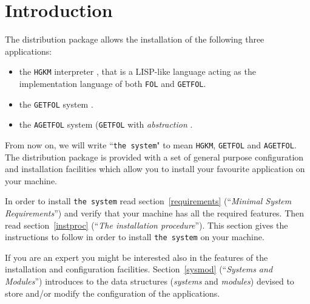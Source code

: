 \section{Introduction}

The distribution package allows the installation of the following three
applications:
%
\begin{itemize}
	\item
		the {\tt HGKM} interpreter \cite{giunchiglia35}, that is a LISP-like
		language acting as the implementation language of both {\tt FOL}
		and {\tt GETFOL}.
	\item
		the {\tt GETFOL} system \cite{giunchiglia12,giunchiglia29}.
	\item
		the {\tt AGETFOL} system ({\tt GETFOL} with {\em abstraction}
		\cite{giunchiglia7}.
\end{itemize}

From now on, we will write ``{\tt the system}" to mean {\tt HGKM},
{\tt GETFOL} and {\tt AGETFOL}.
The distribution package is provided with a set of general purpose
configuration and installation facilities which allow you to install your
favourite application on your machine.

In order to install {\tt the system} read section~\ref{requirements}
(``{\it Minimal System Requirements}'') and verify that your machine
has all the required features.
Then read section~\ref{instproc} (``{\it The installation procedure}'').
This section gives the instructions to follow in order to install
{\tt the system} on your machine.

If you are an expert you might be interested also in the features
of the installation and configuration facilities.
Section~\ref{sysmod} (``{\it Systems and Modules}'') introduces
to the data structures ({\it systems} and {\it modules}) devised
to store and/or modify the configuration of the applications.
